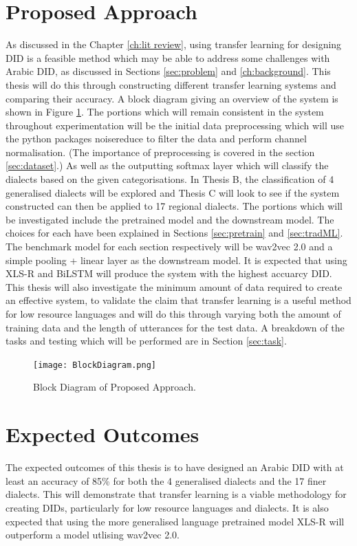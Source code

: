 \section{Proposed Approach}
As discussed in the Chapter \ref{ch:lit review}, using transfer learning for designing DID is a feasible method which 
may be able to address some challenges with Arabic DID, as discussed in Sections \ref{sec:problem} and \ref{ch:background}. 
This thesis will do this through constructing different transfer learning systems and comparing their accuracy. A block diagram 
giving an overview of the system is shown in Figure \ref{fig:Block}. The portions which 
will remain consistent in the system throughout experimentation will be the initial data preprocessing which will use the python packages noisereduce 
to filter the data and perform channel normalisation. (The importance of preprocessing is covered in the section \ref{sec:dataset}.) As well as the outputting softmax layer which will classify the dialects based on the 
given categorisations. In Thesis B, the classification of 4 generalised dialects will be explored and Thesis C will look to see if the system constructed 
can then be applied to 17 regional dialects. The portions which will be investigated include the pretrained model and the downstream model. The choices for 
each have been explained in Sections \ref{sec:pretrain} and \ref{sec:tradML}. The benchmark model for each section respectively will be wav2vec 2.0 and a simple 
pooling + linear layer as the downstream model. It is expected that using XLS-R and BiLSTM will produce the system with the highest accuarcy DID. This thesis 
will also investigate the minimum amount of data required to create an effective system, to validate the claim that transfer learning is a useful method for low resource 
languages and will do this through varying both the amount of training data and the length of utterances for the test data. A breakdown of the tasks and testing which 
will be performed are in Section \ref{sec:task}. 

\begin{figure}[h!]
    \centering
    \texttt{[image: BlockDiagram.png]}
    \caption{Block Diagram of Proposed Approach.}
    \label{fig:Block}
\end{figure}

\section{Expected Outcomes}
The expected outcomes of this thesis is to have designed an Arabic DID with at 
least an accuracy of 85\% for both the 4 generalised dialects and the 17 finer dialects. 
This will demonstrate that transfer learning is a viable methodology for 
creating DIDs, particularly for low resource languages and dialects.
It is also expected that using the more generalised language pretrained model XLS-R 
will outperform a model utlising wav2vec 2.0. 


